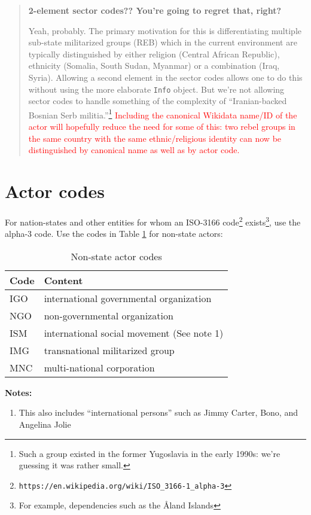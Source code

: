 \documentclass[11pt]{report}
\newcommand{\txt}[1]{\texttt{#1}}
\newcommand{\fn}[1]{\footnote{#1}}
\newcommand{\andy}[1]{\textcolor{red}{#1}}
\begin{document}
\begin{quote}
\textbf{2-element sector codes?? You're going  to regret that, right?}

Yeah, probably. The primary motivation for this is differentiating multiple sub-state militarized groups (REB) which in the current environment are typically distinguished by either religion (Central African Republic), ethnicity (Somalia, South Sudan, Myanmar) or a combination (Iraq, Syria). Allowing a second element in the sector codes allows one to do this without using the more elaborate \texttt{Info} object. But we're not allowing sector codes to handle something of the complexity of ``Iranian-backed Bosnian Serb militia.''\fn{Such a group existed in the former Yugoslavia in the early 1990s: we're guessing it was rather small.}
\andy{Including the canonical Wikidata name/ID of the actor will hopefully reduce the need for some of this: two rebel groups in the same country with the same ethnic/religious identity can now be distinguished by canonical name as well as by actor code.}
\end{quote}

\section{Actor codes}

For nation-states and other entities for whom an ISO-3166 code\fn{\txt{https://en.wikipedia.org/wiki/ISO\_3166-1\_alpha-3}} exists\fn{For example, dependencies such as the \AA land Islands}, use the alpha-3 code. Use the codes in Table \ref{tab:nonstate} for non-state actors:

\begin{table}[htp]
\caption{Non-state actor codes}
\begin{center}
\begin{tabular}{|l|l|}
\hline
Code & Content \\
\hline
IGO   &   international governmental organization\\
NGO &   non-governmental organization\\
ISM           &   international social movement (See note 1)\\
IMG            &   transnational militarized group\\
MNC            &   multi-national corporation\\
\hline
\end{tabular}
\end{center}
\label{tab:nonstate}
\noindent \textbf{Notes:}
\begin{enumerate}
\item This also includes ``international persons'' such as Jimmy Carter, Bono, and Angelina Jolie  
\end{enumerate}
\end{table}%
\end{document}
